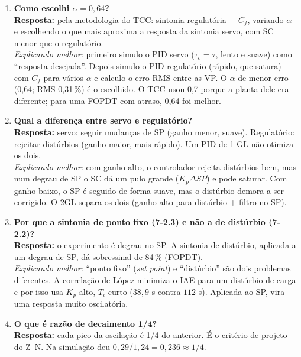 \documentclass[11pt,a4paper]{article}
\begin{document}
\begin{enumerate}[leftmargin=*]
\emph{Explicando melhor:} o PI tem um zero em $-1/T_i$. $C_f$ tem um polo em $-1/T_i$ (cancela o zero) e um zero em $-1/((1-\alpha)T_i)$. O produto $C_f\cdot PI=K_p\frac{(1-\alpha)T_is+1}{T_is}$: para $\alpha$ maior, o zero fica mais afastado e o SP vê menos ação proporcional. Como $C_f$ só multiplica o SP, a FT de distúrbio $VP/D=G/(1+(PI+D)G)$ não tem $C_f$.
\item \textbf{Como escolhi $\alpha=0{,}64$?}\\
\textbf{Resposta:} pela metodologia do TCC: sintonia regulatória + $C_f$, variando $\alpha$ e escolhendo o que mais aproxima a resposta da sintonia servo, com SC menor que o regulatório.\\
\emph{Explicando melhor:} primeiro simulo o PID servo ($\tau_c=\tau$, lento e suave) como ``resposta desejada''. Depois simulo o PID regulatório (rápido, que satura) com $C_f$ para vários $\alpha$ e calculo o erro RMS entre as VP. O $\alpha$ de menor erro (0,64; RMS 0,31\,\%) é o escolhido. O TCC usou 0,7 porque a planta dele era diferente; para uma FOPDT com atraso, 0,64 foi melhor.
\item \textbf{Qual a diferença entre servo e regulatório?}\\
\textbf{Resposta:} servo: seguir mudanças de SP (ganho menor, suave). Regulatório: rejeitar distúrbios (ganho maior, mais rápido). Um PID de 1 GL não otimiza os dois.\\
\emph{Explicando melhor:} com ganho alto, o controlador rejeita distúrbios bem, mas num degrau de SP o SC dá um pulo grande ($K_p\Delta SP$) e pode saturar. Com ganho baixo, o SP é seguido de forma suave, mas o distúrbio demora a ser corrigido. O 2GL separa os dois (ganho alto para distúrbio + filtro no SP).
\item \textbf{Por que a sintonia de ponto fixo (7-2.3) e não a de distúrbio (7-2.2)?}\\
\textbf{Resposta:} o experimento é degrau no SP. A sintonia de distúrbio, aplicada a um degrau de SP, dá sobressinal de 84\,\% (FOPDT).\\
\emph{Explicando melhor:} ``ponto fixo'' (\emph{set point}) e ``distúrbio'' são dois problemas diferentes. A correlação de López minimiza o IAE para um distúrbio de carga e por isso usa $K_p$ alto, $T_i$ curto ($38{,}9$ s contra $112$ s). Aplicada ao SP, vira uma resposta muito oscilatória.
\item \textbf{O que é razão de decaimento 1/4?}\\
\textbf{Resposta:} cada pico da oscilação é 1/4 do anterior. É o critério de projeto do Z--N. Na simulação deu $0{,}29/1{,}24=0{,}236\approx1/4$.\\

\end{enumerate}
\end{document}
